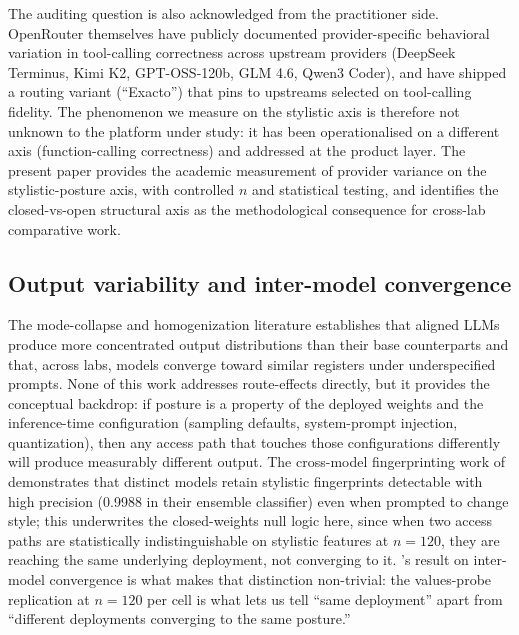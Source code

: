 \documentclass[11pt,a4paper]{article}
\begin{document}
The auditing question is also acknowledged from the practitioner side. OpenRouter themselves \citep{openrouter2025exacto} have publicly documented provider-specific behavioral variation in tool-calling correctness across upstream providers (DeepSeek Terminus, Kimi K2, GPT-OSS-120b, GLM 4.6, Qwen3 Coder), and have shipped a routing variant (``Exacto'') that pins to upstreams selected on tool-calling fidelity. The phenomenon we measure on the stylistic axis is therefore not unknown to the platform under study: it has been operationalised on a different axis (function-calling correctness) and addressed at the product layer. The present paper provides the academic measurement of provider variance on the stylistic-posture axis, with controlled $n$ and statistical testing, and identifies the closed-vs-open structural axis as the methodological consequence for cross-lab comparative work.

\subsection{Output variability and inter-model convergence}

The mode-collapse and homogenization literature \citep{janus2022modes,kirk2024rlhf,wenger2025homogeneity} establishes that aligned LLMs produce more concentrated output distributions than their base counterparts and that, across labs, models converge toward similar registers under underspecified prompts. None of this work addresses route-effects directly, but it provides the conceptual backdrop: if posture is a property of the deployed weights and the inference-time configuration (sampling defaults, system-prompt injection, quantization), then any access path that touches those configurations differently will produce measurably different output. The cross-model fingerprinting work of \citet{bitton2025fingerprints} demonstrates that distinct models retain stylistic fingerprints detectable with high precision (0.9988 in their ensemble classifier) even when prompted to change style; this underwrites the closed-weights null logic here, since when two access paths are statistically indistinguishable on stylistic features at $n{=}120$, they are reaching the same underlying deployment, not converging to it. \citet{jiang2025hivemind}'s result on inter-model convergence is what makes that distinction non-trivial: the values-probe replication at $n{=}120$ per cell is what lets us tell ``same deployment'' apart from ``different deployments converging to the same posture.''
\end{document}
